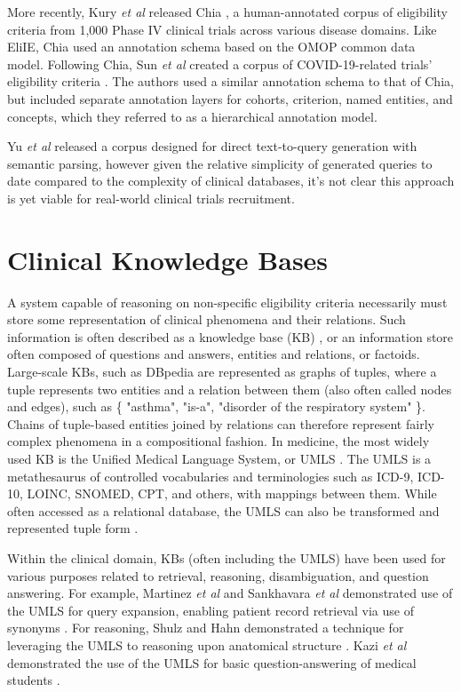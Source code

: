 \documentclass[../main.tex]{subfiles}
\begin{document}
More recently, Kury \textit{et al} released Chia \cite{kury2020chia}, a human-annotated corpus of eligibility criteria from 1,000 Phase IV clinical trials across various disease domains. Like EliIE, Chia used an annotation schema based on the OMOP common data model. Following Chia, Sun \textit{et al} created a corpus of COVID-19-related trials' eligibility criteria \cite{sun2021building}. The authors used a similar annotation schema to that of Chia, but included separate annotation layers for cohorts, criterion, named entities, and concepts, which they referred to as a hierarchical annotation model. 

Yu \textit{et al} \cite{yu2020} released a corpus designed for direct text-to-query generation with semantic parsing, however given the relative simplicity of generated queries to date compared to the complexity of clinical databases, it's not clear this approach is yet viable for real-world clinical trials recruitment.

\section{Clinical Knowledge Bases}

A system capable of reasoning on non-specific eligibility criteria necessarily must store some representation of clinical phenomena and their relations. Such information is often described as a knowledge base (KB) \cite{guarino1995ontologies}, or an information store often composed of questions and answers, entities and relations, or factoids. Large-scale KBs, such as DBpedia \cite{lehmann2015dbpedia} are represented as graphs of tuples, where a tuple represents two entities and a relation between them (also often called nodes and edges), such as \{ "asthma", "is-a", "disorder of the respiratory system" \}. Chains of tuple-based entities joined by relations can therefore represent fairly complex phenomena in a compositional fashion. In medicine, the most widely used KB is the Unified Medical Language System, or UMLS \cite{bodenreider2004unified}. The UMLS is a metathesaurus of controlled vocabularies and terminologies such as ICD-9, ICD-10, LOINC, SNOMED, CPT, and others, with mappings between them. While often accessed as a relational database, the UMLS can also be transformed and represented tuple form \cite{noy2009bioportal}. 

Within the clinical domain, KBs (often including the UMLS) have been used for various purposes related to retrieval, reasoning, disambiguation, and question answering. For example, Martinez \textit{et al} and Sankhavara \textit{et al} demonstrated use of the UMLS for query expansion, enabling patient record retrieval via use of synonyms \cite{martinez2014improving, sankhavara2020query}. For reasoning, Shulz and Hahn demonstrated a technique for leveraging the UMLS to reasoning upon anatomical structure \cite{schulz2001medical}. Kazi \textit{et al} demonstrated the use of the UMLS for basic question-answering of medical students \cite{kazi2012medchatbot}. 
\end{document}
